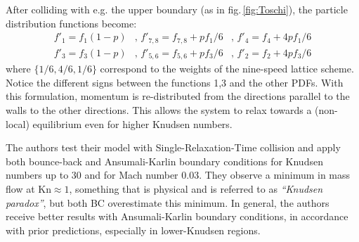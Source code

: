 After colliding with e.g. the upper boundary (as in fig.\,\ref{fig:Toschi}),
the particle distribution functions become:
\begin{eqnarray*}
 f'_1 = f_1(1-p) &\textrm{, \ \ } f'_{7,8} = f_{7,8} + p f_1 / 6 &\textrm{, \ \ } f'_4 = f_4 + 4 p f_1 / 6 \\
 f'_3 = f_3(1-p) &\textrm{, \ \ } f'_{5,6} = f_{5,6} + p f_3 / 6 &\textrm{, \ \ } f'_2 = f_2 + 4 p f_3 / 6
\end{eqnarray*}
where $\{ 1/6, 4/6, 1/6 \}$ correspond to the weights of the nine-speed lattice scheme.
Notice the different signs between the functions 1,3 and the other PDFs. With this formulation,
momentum is re-distributed from the directions parallel to the walls to the other directions.
This allows the system to relax towards a (non-local) equilibrium even for higher Knudsen numbers.

The authors test their model with Single-Relaxation-Time collision and apply both bounce-back
and Ansumali-Karlin boundary conditions for Knudsen numbers up to 30 and for Mach number 0.03.
They observe a minimum in mass flow at $\mathrm{Kn}\approx 1$, something that is physical
and is referred to as \textit{``Knudsen paradox''}, but both BC overestimate this minimum.
In general, the authors receive better results with Ansumali-Karlin boundary conditions,
in accordance with prior predictions, especially in lower-Knudsen regions.
